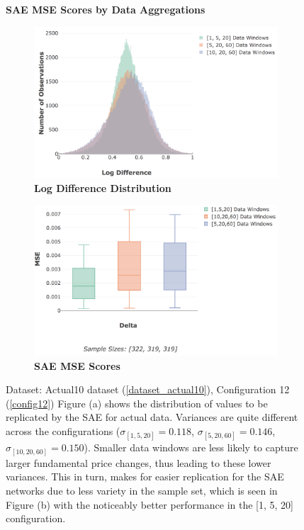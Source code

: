\documentclass[a4paper,11pt,oneside]{article}
\theoremstyle{plain}
\theoremstyle{definition}
\begin{document}
	
	\begin{figure}[H]
		\centering
		\textbf{SAE MSE Scores by Data Aggregations}
		\begin{subfigure}{.99\textwidth}
			\centering 
			\includegraphics[scale=0.4]{images/results/8_2_determinants/actual_aggregate_dist.png}
			\caption{\textbf{Log Difference Distribution}
				\newline }
			\label{figure-actual_aggregate_dist}
		\end{subfigure}
		\begin{subfigure}{.99\textwidth}
			\centering 
			\includegraphics[scale=0.4]{images/results/8_2_determinants/actual_aggregation_mse.png}
			\caption{\textbf{SAE MSE Scores} 
				\newline }
			\label{figure-actual_aggregation_mse}
		\end{subfigure}
		\caption[SAE MSE Scores by Data Aggregations]
		{Dataset: Actual10 dataset (\ref{dataset_actual10}), Configuration 12 (\ref{config12})
			\newline \newline Figure (a) shows the distribution of values to be replicated by the SAE for actual data. Variances are quite different across the configurations ($\sigma_{[1,5,20]} = 0.118$, $\sigma_{[5,20,60]} = 0.146$, $\sigma_{[10,20,60]} = 0.150$). Smaller data windows are less likely to capture larger fundamental price changes, thus leading to these lower variances. This in turn, makes for easier replication for the SAE networks due to less variety in the sample set, which is seen in Figure (b) with the noticeably better performance in the [1, 5, 20] configuration.}
		\label{fig_data_sae_actual}
	\end{figure}
	
\end{document}
